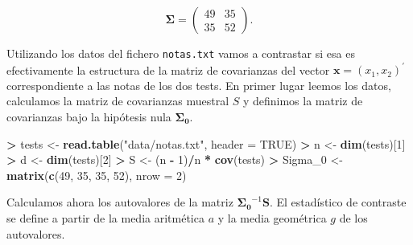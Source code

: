 \documentclass[
  a4paper,
  oneside]{scrbook}
\newenvironment{Shaded}{\begin{snugshade}}{\end{snugshade}}
\newcommand{\AttributeTok}[1]{\textcolor[rgb]{0.13,0.29,0.53}{#1}}
\newcommand{\ConstantTok}[1]{\textcolor[rgb]{0.56,0.35,0.01}{#1}}
\newcommand{\DecValTok}[1]{\textcolor[rgb]{0.00,0.00,0.81}{#1}}
\newcommand{\FunctionTok}[1]{\textcolor[rgb]{0.13,0.29,0.53}{\textbf{#1}}}
\newcommand{\NormalTok}[1]{#1}
\newcommand{\OtherTok}[1]{\textcolor[rgb]{0.56,0.35,0.01}{#1}}
\newcommand{\SpecialCharTok}[1]{\textcolor[rgb]{0.81,0.36,0.00}{\textbf{#1}}}
\newcommand{\StringTok}[1]{\textcolor[rgb]{0.31,0.60,0.02}{#1}}
\theoremstyle{definition}
\theoremstyle{definition}
\theoremstyle{definition}
\theoremstyle{definition}
\theoremstyle{remark}
\begin{document}
\[\bm{\Sigma}=\left(\begin{array}{cc}
49 & 35 \\
35 & 52
\end{array}\right).\]

Utilizando los datos del fichero \texttt{notas.txt} vamos a contrastar si esa
es efectivamente la estructura de la matriz de covarianzas del vector
\(\bm{x}=(x_1,x_2)^\prime{}\) correspondiente a las notas de los dos
tests. En primer lugar leemos los datos, calculamos la matriz de
covarianzas muestral \(S\) y definimos la matriz de covarianzas bajo la
hipótesis nula \(\bm{\Sigma_0}\).

\footnotesize

\begin{Shaded}
\begin{Highlighting}[]
\SpecialCharTok{\textgreater{}}\NormalTok{ tests }\OtherTok{\textless{}{-}} \FunctionTok{read.table}\NormalTok{(}\StringTok{"data/notas.txt"}\NormalTok{, }\AttributeTok{header =} \ConstantTok{TRUE}\NormalTok{)}
\SpecialCharTok{\textgreater{}}\NormalTok{ n }\OtherTok{\textless{}{-}} \FunctionTok{dim}\NormalTok{(tests)[}\DecValTok{1}\NormalTok{]}
\SpecialCharTok{\textgreater{}}\NormalTok{ d }\OtherTok{\textless{}{-}} \FunctionTok{dim}\NormalTok{(tests)[}\DecValTok{2}\NormalTok{]}
\SpecialCharTok{\textgreater{}}\NormalTok{ S }\OtherTok{\textless{}{-}}\NormalTok{ (n }\SpecialCharTok{{-}} \DecValTok{1}\NormalTok{)}\SpecialCharTok{/}\NormalTok{n }\SpecialCharTok{*} \FunctionTok{cov}\NormalTok{(tests)}
\SpecialCharTok{\textgreater{}}\NormalTok{ Sigma\_0 }\OtherTok{\textless{}{-}} \FunctionTok{matrix}\NormalTok{(}\FunctionTok{c}\NormalTok{(}\DecValTok{49}\NormalTok{, }\DecValTok{35}\NormalTok{, }\DecValTok{35}\NormalTok{, }\DecValTok{52}\NormalTok{), }\AttributeTok{nrow =} \DecValTok{2}\NormalTok{)}
\end{Highlighting}
\end{Shaded}

\normalsize

Calculamos ahora los autovalores de la matriz
\(\bm{\Sigma_0}^{-1}\bm{S}\). El estadístico de contraste se define a
partir de la media aritmética \(a\) y la media geométrica \(g\) de los
autovalores.

\footnotesize
\end{document}
